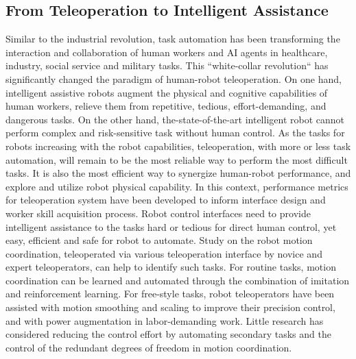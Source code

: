 \subsection{From Teleoperation to Intelligent Assistance}\label{sec:back-intelligent}

Similar to the industrial revolution, task automation has been transforming the interaction and collaboration of human workers and AI agents in healthcare, industry, social service and military tasks. This ``white-collar revolution`` has significantly changed the paradigm of human-robot teleoperation. On one hand, intelligent assistive robots augment the physical and cognitive capabilities of human workers, relieve them from repetitive, tedious, effort-demanding, and dangerous tasks. On the other hand, the-state-of-the-art intelligent robot cannot perform complex and risk-sensitive task without human control. As the tasks for robots increasing with the robot capabilities, teleoperation, with more or less task automation, will remain to be the most reliable way to perform the most difficult tasks. It is also the most efficient way to synergize human-robot performance, and explore and utilize robot physical capability. 
In this context, performance metrics for teleoperation system have been developed to inform interface design and worker skill acquisition process. Robot control interfaces need to provide intelligent assistance to the tasks hard or tedious for direct human control, yet easy, efficient and safe for robot to automate. Study on the robot motion coordination, teleoperated via various teleoperation interface by novice and expert teleoperators, can help to identify such tasks. For routine tasks, motion coordination can be learned and automated through the combination of imitation and reinforcement learning. For free-style tasks, robot teleoperators have been assisted with motion smoothing and scaling to improve their precision control, and with power augmentation in labor-demanding work. Little research has considered reducing the control effort by automating secondary tasks and the control of the redundant degrees of freedom in motion coordination. 


